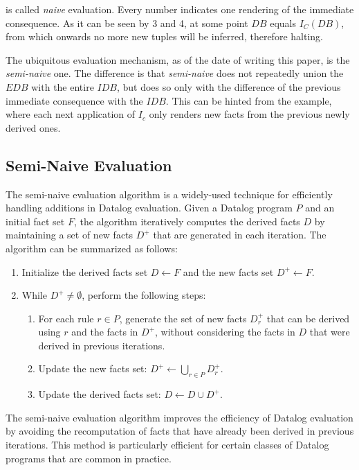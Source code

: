\documentclass[sigconf,screen,review,natbib]{acmart}
\theoremstyle{definition}
\begin{document}
is called \textit{naive} evaluation. Every number indicates one rendering of the immediate consequence. As it can be seen by 3 and 4, at some point $DB$ equals $I_C(DB)$, from which onwards no more new tuples will be inferred, therefore halting.

The ubiquitous evaluation mechanism, as of the date of writing this paper, is the \textit{semi-naive} one. The difference is that \textit{semi-naive} does not repeatedly union the $EDB$ with the entire $IDB$, but does so only with the difference of the previous immediate consequence with the $IDB$. This can be hinted from the example, where each next application of $I_c$ only renders new facts from the previous newly derived ones.

\subsection{Semi-Naive Evaluation}

The semi-naive evaluation algorithm \cite{datalog} is a widely-used technique for efficiently handling additions in Datalog evaluation. Given a Datalog program $P$ and an initial fact set $F$, the algorithm iteratively computes the derived facts $D$ by maintaining a set of new facts $D^+$ that are generated in each iteration. The algorithm can be summarized as follows:

\begin{enumerate}
	\item Initialize the derived facts set $D \leftarrow F$ and the new facts set $D^+ \leftarrow F$.

	\item While $D^+ \neq \emptyset$, perform the following steps:
	      \begin{enumerate}
		      \item For each rule $r \in P$, generate the set of new facts $D^+_r$ that can be derived using $r$ and the facts in $D^+$, without considering the facts in $D$ that were derived in previous iterations.

		      \item Update the new facts set: $D^+ \leftarrow \bigcup_{r \in P} D^+_r$.

		      \item Update the derived facts set: $D \leftarrow D \cup D^+$.
	      \end{enumerate}
\end{enumerate}

The semi-naive evaluation algorithm improves the efficiency of Datalog evaluation by avoiding the recomputation of facts that have already been derived in previous iterations. This method is particularly efficient for certain classes of Datalog programs that are common in practice.
\end{document}
